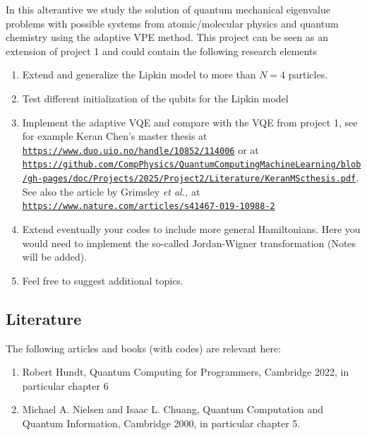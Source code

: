 \documentclass[%
oneside,                 %
final,                   %
10pt]{article}
\begin{document}
In this alterantive we study the solution of quantum mechanical
eigenvalue problems with possible systems from atomic/molecular physics and
quantum chemistry using the adaptive VPE method.
This project can be seen as an extension of project 1 and could contain the following research elements
\begin{enumerate}
\item Extend and generalize the Lipkin model to more than $N=4$ particles.

\item Test different initialization of the qubits for the Lipkin model

\item Implement the adaptive VQE and compare with the VQE from project 1, see for example Keran Chen's master thesis at \href{{https://www.duo.uio.no/handle/10852/114006}}{\nolinkurl{https://www.duo.uio.no/handle/10852/114006}} or at \href{{https://github.com/CompPhysics/QuantumComputingMachineLearning/blob/gh-pages/doc/Projects/2025/Project2/Literature/KeranMScthesis.pdf}}{\nolinkurl{https://github.com/CompPhysics/QuantumComputingMachineLearning/blob/gh-pages/doc/Projects/2025/Project2/Literature/KeranMScthesis.pdf}}. See also the article by Grimsley \emph{et al.,} at \href{{https://www.nature.com/articles/s41467-019-10988-2}}{\nolinkurl{https://www.nature.com/articles/s41467-019-10988-2}}

\item Extend eventually your codes to include more general Hamiltonians. Here you would need to implement the so-called Jordan-Wigner transformation (Notes will be added). 

\item Feel free to suggest additional topics. 
\end{enumerate}

\noindent
\subsection*{Literature}

The following articles and books (with codes) are relevant here:
\begin{enumerate}
\item Robert Hundt, Quantum Computing for Programmers, Cambridge 2022, in particular chapter 6

\item Michael A. Nielsen and Isaac L. Chuang, Quantum Computation and Quantum Information, Cambridge 2000, in particular chapter 5.
\end{enumerate}
\end{document}
